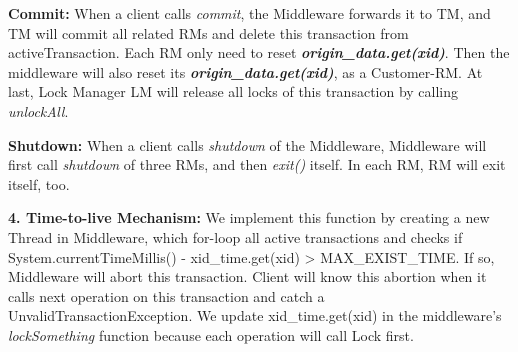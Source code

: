 \documentclass[a4paper, 11pt]{ctexart}
\newcommand{\newQuestion}[1]{\vspace{5pt}\textbf{\Large #1}}
\begin{document}
\textbf{Commit:} When a client calls \textit{commit}, the Middleware forwards it to TM, and TM will commit all related RMs and delete this transaction from activeTransaction. Each RM only need to reset \textbf{\textit{origin\_data.get(xid)}}. Then the middleware will also reset its \textbf{\textit{origin\_data.get(xid)}}, as a Customer-RM. At last, Lock Manager LM will release all locks of this transaction by calling \textit{unlockAll}.

\textbf{Shutdown:} When a client calls \textit{shutdown} of the Middleware, Middleware will first call \textit{shutdown} of three RMs, and then \textit{exit()} itself. In each RM, RM will exit itself, too.

\newQuestion{4. Time-to-live Mechanism:} We implement this function by creating a new Thread in Middleware, which for-loop all active transactions and checks if System.currentTimeMillis() - xid\_time.get(xid) > MAX\_EXIST\_TIME. If so, Middleware will abort this transaction. Client will know this abortion when it calls next operation on this transaction and catch a UnvalidTransactionException. We update xid\_time.get(xid) in the middleware's \textit{lockSomething} function because each operation will call Lock first.
\end{document}
